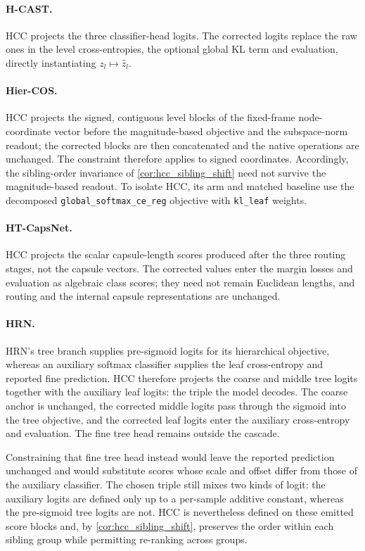 \paragraph{H-CAST.} HCC projects the three classifier-head logits. The corrected
logits replace the raw ones in the level cross-entropies, the optional global KL
term and evaluation, directly instantiating $z_l\mapsto\hat z_l$.

\paragraph{Hier-COS.} HCC projects the signed, contiguous level blocks of the
fixed-frame node-coordinate vector before the magnitude-based objective and the
subspace-norm readout; the corrected blocks are then concatenated and the native
operations are unchanged. The constraint therefore applies to signed
coordinates. Accordingly, the sibling-order invariance of
\cref{cor:hcc_sibling_shift} need not survive the magnitude-based readout. To
isolate HCC, its arm and matched baseline use the decomposed
\texttt{global\_softmax\_ce\_reg} objective with \texttt{kl\_leaf} weights.

\paragraph{HT-CapsNet.} HCC projects the scalar capsule-length scores produced
after the three routing stages, not the capsule vectors. The corrected values
enter the margin losses and evaluation as algebraic class scores; they need not
remain Euclidean lengths, and routing and the internal capsule representations
are unchanged.

\paragraph{HRN.} HRN's tree branch supplies pre-sigmoid logits for its
hierarchical objective, whereas an auxiliary softmax classifier supplies the
leaf cross-entropy and reported fine prediction. HCC therefore projects the
coarse and middle tree logits together with the auxiliary leaf logits: the
triple the model decodes. The coarse anchor is unchanged, the corrected middle
logits pass through the sigmoid into the tree objective, and the corrected leaf
logits enter the auxiliary cross-entropy and evaluation. The fine tree head
remains outside the cascade.

Constraining that fine tree head instead would leave the reported prediction
unchanged and would substitute scores whose scale and offset differ from those
of the auxiliary classifier. The chosen triple still mixes two kinds of logit:
the auxiliary logits are defined only up to a per-sample additive constant,
whereas the pre-sigmoid tree logits are not. HCC is nevertheless defined on
these emitted score blocks and, by \cref{cor:hcc_sibling_shift}, preserves the
order within each sibling group while permitting re-ranking across groups.

